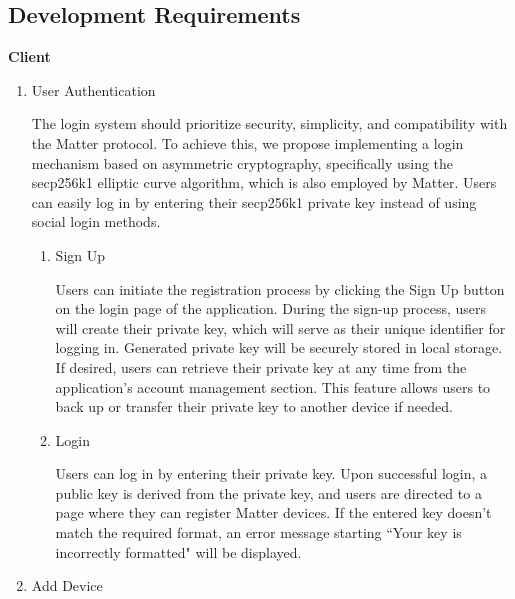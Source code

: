 \documentclass[conference]{IEEEtran}
\begin{document}
\subsection{Development Requirements}
{\centering \textbf{Client} \par}
\begin{enumerate}[itemsep=2ex, parsep=1ex]
	\item User Authentication
	      	      
	      The login system should prioritize security, simplicity, and compatibility
	      with the Matter protocol. To achieve this, we propose implementing a login
	      mechanism based on asymmetric cryptography, specifically using the secp256k1
	      elliptic curve algorithm, which is also employed by Matter. Users can easily
	      log in by entering their secp256k1 private key instead of using social login
	      methods.
	      	      
	      \begin{enumerate}[itemsep=2ex, parsep=1ex]
	      	\item Sign Up
	      	      	      	      
	      	      Users can initiate the registration process by clicking the Sign Up
	      	      button on the login page of the application. During the sign-up process,
	      	      users will create their private key, which will serve as their unique identifier
	      	      for logging in. Generated private key will be securely stored in local
	      	      storage. If desired, users can retrieve their private key at any time
	      	      from the application's account management section. This feature allows
	      	      users to back up or transfer their private key to another device if needed.
	      	      	      	      
	      	\item Login
	      	      	      	      
	      	      Users can log in by entering their private key. Upon successful login,
	      	      a public key is derived from the private key, and users are directed to
	      	      a page where they can register Matter devices. If the entered key
	      	      doesn't match the required format, an error message starting ``Your key
	      	      is incorrectly formatted" will be displayed.
	      \end{enumerate}
	      	      
	\item Add Device
	      	      

\end{enumerate}
\end{document}
